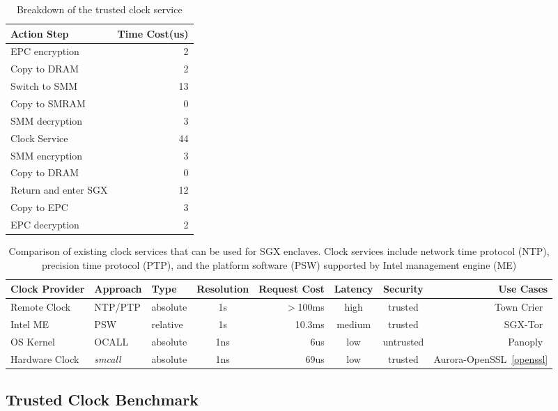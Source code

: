 \begin{table}
	\centering
	\caption{ Breakdown of the trusted clock service}
	\small
	\label{table:breaktime}
	\begin{tabular}{lr}
		\toprule
		\textbf{Action Step} & \textbf{Time Cost(us)} \\
		\midrule
		EPC encryption & 2\\
		Copy to DRAM & 2\\
		Switch to SMM & 13\\
		Copy to SMRAM & 0\\
		SMM decryption & 3\\
		Clock Service & 44\\
		SMM encryption & 3\\
		Copy to DRAM & 0\\
		Return and enter SGX & 12\\
		Copy to EPC & 3\\
		EPC decryption & 2\\
		\bottomrule
	\end{tabular}
\end{table}

\begin{table}[t]
	\centering
	\caption{Comparison of existing clock services that can be used for SGX enclaves. Clock services include network time protocol (NTP), precision time protocol (PTP), and the platform software (PSW) supported by Intel management engine (ME)}
	\label{table:timeservice}
	\small
	\begin{tabular}{lllcrccr}
		\toprule
		\textbf{Clock Provider} & \textbf{Approach} & \textbf{Type} & \textbf{Resolution} & \textbf{Request Cost} & \textbf{Latency} & \textbf{Security} & \textbf{Use Cases} \\
		\midrule
		Remote Clock & NTP/PTP & absolute & 1s & $>$100ms & high & trusted & Town Crier~\cite{DBLP:conf/ccs/ZhangCCJS16} \\
		Intel ME & PSW & relative & 1s & 10.3ms & medium & trusted & SGX-Tor~\cite{DBLP:conf/nsdi/KimHHKH17} \\
		OS Kernel & OCALL & absolute & 1ns & 6us & low & untrusted & Panoply~\cite{shinde_panoply:_2017} \\
		Hardware Clock & \textit{smcall} & absolute & 1ns & 69us & low & trusted & Aurora-OpenSSL~\ref{openssl} \\
		\bottomrule
	\end{tabular}
\end{table}


\subsection{Trusted Clock Benchmark}\label{time_bench}

